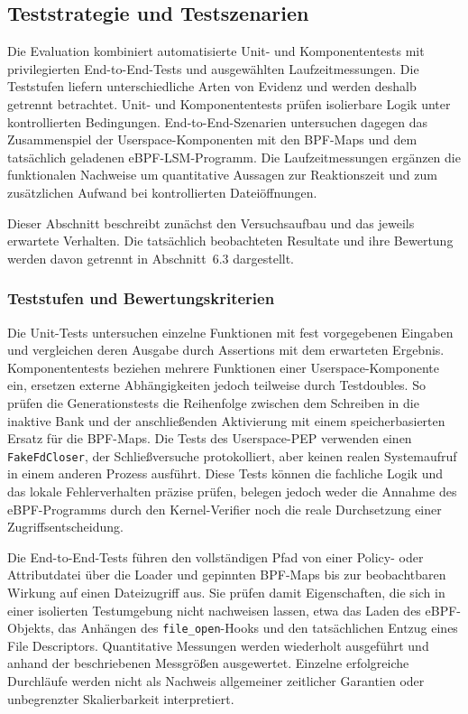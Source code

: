\subsection{Teststrategie und Testszenarien}

Die Evaluation kombiniert automatisierte Unit- und Komponententests mit privilegierten
End-to-End-Tests und ausgewählten Laufzeitmessungen. Die Teststufen liefern unterschiedliche
Arten von Evidenz und werden deshalb getrennt betrachtet. Unit- und Komponententests prüfen
isolierbare Logik unter kontrollierten Bedingungen. End-to-End-Szenarien untersuchen dagegen das
Zusammenspiel der Userspace-Komponenten mit den BPF-Maps und dem tatsächlich geladenen
eBPF-LSM-Programm. Die Laufzeitmessungen ergänzen die funktionalen Nachweise um quantitative
Aussagen zur Reaktionszeit und zum zusätzlichen Aufwand bei kontrollierten Dateiöffnungen.

Dieser Abschnitt beschreibt zunächst den Versuchsaufbau und das jeweils erwartete Verhalten. Die
tatsächlich beobachteten Resultate und ihre Bewertung werden davon getrennt in Abschnitt~6.3
dargestellt.

\subsubsection{Teststufen und Bewertungskriterien}

Die Unit-Tests untersuchen einzelne Funktionen mit fest vorgegebenen Eingaben und vergleichen deren
Ausgabe durch Assertions mit dem erwarteten Ergebnis. Komponententests beziehen mehrere Funktionen
einer Userspace-Komponente ein, ersetzen externe Abhängigkeiten jedoch teilweise durch
Testdoubles. So prüfen die Generationstests die Reihenfolge zwischen dem Schreiben in die inaktive
Bank und der anschließenden Aktivierung mit einem speicherbasierten Ersatz für die BPF-Maps.
Die Tests des Userspace-PEP verwenden einen
\texttt{FakeFdCloser}, der Schließversuche protokolliert, aber keinen realen Systemaufruf in einem
anderen Prozess ausführt. Diese Tests können die fachliche Logik und das lokale Fehlerverhalten
präzise prüfen, belegen jedoch weder die Annahme des eBPF-Programms durch den Kernel-Verifier noch
die reale Durchsetzung einer Zugriffsentscheidung.

Die End-to-End-Tests führen den vollständigen Pfad von einer Policy- oder Attributdatei über die
Loader und gepinnten BPF-Maps bis zur beobachtbaren Wirkung auf einen Dateizugriff aus. Sie prüfen
damit Eigenschaften, die sich in einer isolierten Testumgebung nicht nachweisen lassen, etwa das
Laden des eBPF-Objekts, das Anhängen des \texttt{file\_open}-Hooks und den tatsächlichen Entzug
eines File Descriptors. Quantitative Messungen werden wiederholt ausgeführt und anhand der
beschriebenen Messgrößen ausgewertet. Einzelne erfolgreiche Durchläufe werden nicht als Nachweis
allgemeiner zeitlicher Garantien oder unbegrenzter Skalierbarkeit interpretiert.

